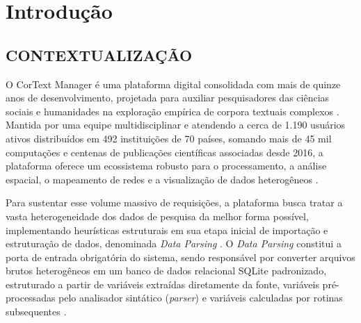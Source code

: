 \documentclass[
	oneside,
	a4paper,
	12pt,
	chapter=TITLE,
	section=TITLE,
	english,
	brazilian
]{abntex2}
\begin{document}
\tableofcontents*
\cleardoublepage

\textual


\chapter{Introdução}\label{sec:introducao}


\FloatBarrier
\section{CONTEXTUALIZAÇÃO}\label{sec:contextualizacao}


O CorText Manager é uma plataforma digital consolidada com mais de quinze anos de desenvolvimento, projetada para auxiliar pesquisadores das ciências sociais e humanidades na exploração empírica de corpora textuais complexos \cite{CorText2026}. Mantida por uma equipe multidisciplinar e atendendo a cerca de 1.190 usuários ativos distribuídos em 492 instituições de 70 países, somando mais de 45 mil computações e centenas de publicações científicas associadas desde 2016, a plataforma oferece um ecossistema robusto para o processamento, a análise espacial, o mapeamento de redes e a visualização de dados heterogêneos \cite{Abdo2021}.

Para sustentar esse volume massivo de requisições, a plataforma busca tratar a vasta heterogeneidade dos dados de pesquisa da melhor forma possível, implementando heurísticas estruturais em sua etapa inicial de importação e estruturação de dados, denominada \textit{Data Parsing} \cite{CorText2026}. O \textit{Data Parsing} constitui a porta de entrada obrigatória do sistema, sendo responsável por converter arquivos brutos heterogêneos em um banco de dados relacional SQLite padronizado, estruturado a partir de variáveis extraídas diretamente da fonte, variáveis pré-processadas pelo analisador sintático (\textit{parser}) e variáveis calculadas por rotinas subsequentes \cite{CorText2026}.
\end{document}

